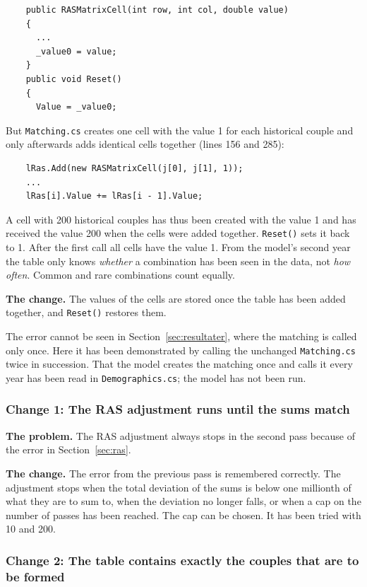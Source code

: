 \documentclass[12pt,a4paper]{article}
\newcommand{\kode}[1]{\texttt{#1}}
\begin{document}
{\small
\begin{verbatim}
    public RASMatrixCell(int row, int col, double value)
    {
      ...
      _value0 = value;
    }
    public void Reset()
    {
      Value = _value0;
\end{verbatim}
}

But \kode{Matching.cs} creates one cell with the value 1 for each historical couple and only
afterwards adds identical cells together (lines 156 and 285):

{\small
\begin{verbatim}
    lRas.Add(new RASMatrixCell(j[0], j[1], 1));
    ...
    lRas[i].Value += lRas[i - 1].Value;
\end{verbatim}
}

A cell with 200 historical couples has thus been created with the value 1 and has received the
value 200 when the cells were added together. \kode{Reset()} sets it back to 1. After the first
call all cells have the value 1. From the model's second year the table only knows \emph{whether} a
combination has been seen in the data, not \emph{how often}. Common and rare combinations count
equally.

\textbf{The change.} The values of the cells are stored once the table has been added together, and
\kode{Reset()} restores them.

The error cannot be seen in Section~\ref{sec:resultater}, where the matching is called only once.
Here it has been demonstrated by calling the unchanged \kode{Matching.cs} twice in succession. That
the model creates the matching once and calls it every year has been read in
\kode{Demographics.cs}; the model has not been run.

\subsubsection*{Change 1: The RAS adjustment runs until the sums match}

\textbf{The problem.} The RAS adjustment always stops in the second pass because of the error in
Section~\ref{sec:ras}.

\textbf{The change.} The error from the previous pass is remembered correctly. The adjustment stops
when the total deviation of the sums is below one millionth of what they are to sum to, when the
deviation no longer falls, or when a cap on the number of passes has been reached. The cap can be
chosen. It has been tried with 10 and 200.

\subsubsection*{Change 2: The table contains exactly the couples that are to be formed}
\end{document}
